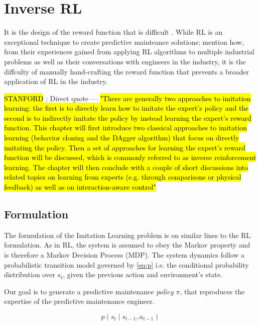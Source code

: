 \documentclass{article}
\newcommand{\hlc}[2][purple!10]{{\colorlet{foo}{#1} \sethlcolor{foo}\hl{#2}}}
\begin{document}
\section{Inverse RL}

It is the design of the reward function that is difficult \citep{abbeel2004apprenticeship, ng2000algorithms}.
While RL is an exceptional technique to create predictive mainteance solutions; \cite{abbeel2004apprenticeship} mention how, from their experiences gained from applying RL algorithms to multiple industrial problems as well as their conversations with engineers in the industry, it is the diffculty of manually hand-crafting the reward function that prevents a broader application of RL in the industry.


\hlc{STANFORD} : Direct quote --- \hlc{"There are generally two approaches to imitation learning: the first is to directly
learn how to imitate the expert’s policy and the second is to indirectly
imitate the policy by instead learning the expert’s reward function. This chapter
will first introduce two classical approaches to imitation learning (behavior
cloning and the DAgger algorithm) that focus on directly imitating the policy.
Then a set of approaches for learning the expert’s reward function will be discussed,
which is commonly referred to as inverse reinforcement learning. The
chapter will then conclude with a couple of short discussions into related topics
on learning from experts (e.g. through comparisons or physical feedback) as
well as on interaction-aware control"}

\subsection{Formulation}

The formulation of the Imitation Learning problem is on similar lines to the RL formulation. As in RL, the system is assumed to obey the Markov property and is therefore a Markov Decision Process (MDP). The system dynamics follow a probabilistic transition model governed by \ref{eq:p} i.e. the conditional probability distribution over $s_t$, given the previous action and environment's state. 

Our goal is to generate a predictive maintenance \textit{policy} $\pi$, that reproduces the expertise of the predictive maintenance engineer.

\begin{equation}\label{eq:p}
	p(s_t \mid s_{t-1}, a_{t-1})
\end{equation}
\end{document}
